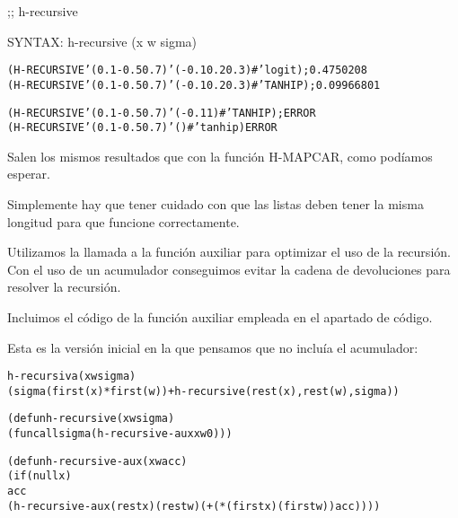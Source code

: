 \begin{aibox}{\function}
;; h-recursive

SYNTAX: h-recursive (x w sigma) 
\end{aibox}

\begin{aibox}{\examples}
\begin{alltt}
(H-RECURSIVE '(0.1 -0.5 0.7) '(-0.1 0.2 0.3) #'logit); 0.4750208
(H-RECURSIVE '(0.1 -0.5 0.7) '(-0.1 0.2 0.3) #'TANHIP); 0.09966801

(H-RECURSIVE '(0.1 -0.5 0.7) '(-0.1 1) #'TANHIP); ERROR
(H-RECURSIVE '(0.1 -0.5 0.7) '() #'tanhip) ERROR
\end{alltt}
\end{aibox}

\begin{aibox}{\comments}
Salen los mismos resultados que con la función H-MAPCAR, como podíamos esperar. 

Simplemente hay que tener cuidado con que las listas deben tener la misma longitud para que funcione correctamente.

Utilizamos la llamada a la función auxiliar para optimizar el uso de la recursión. Con el uso de un acumulador conseguimos evitar la cadena de devoluciones para resolver la recursión.

Incluimos el código de la función auxiliar empleada en el apartado de código.
\end{aibox}

\begin{aibox}{\pseudocode}
Esta es la versión inicial en la que pensamos que no incluía el acumulador: 
\begin{alltt}
h-recursiva (x w sigma)
     (sigma(first(x)*first(w)) + h-recursive(rest(x),rest(w),sigma))
\end{alltt}
\end{aibox}
\begin{aibox}{\code}

\begin{alltt}

(defun h-recursive (x w sigma) 
        (funcall sigma (h-recursive-aux x w 0)))

(defun h-recursive-aux (x w acc)
    (if (null x)
          acc
    (h-recursive-aux (rest x) (rest w) ( + (* (first x)  (first w)) acc))))


\end{alltt}
\end{aibox}

